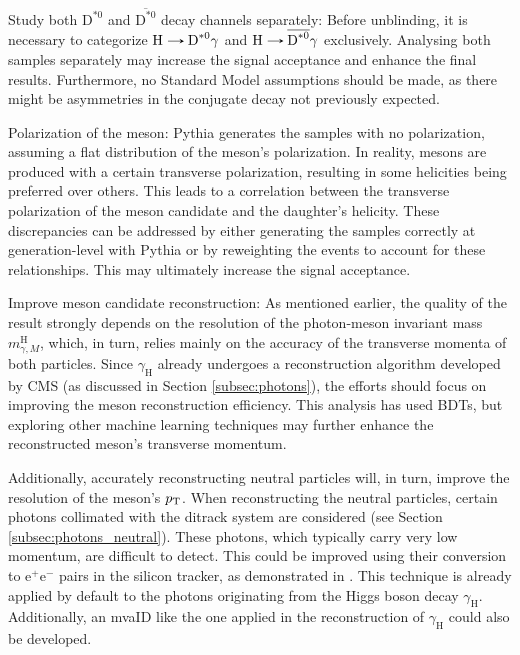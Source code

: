 \begin{myitemlist}
    \item[Study both $\text{D}^{*0}$ and $\overline{\text{D}^{*0}}$ decay channels separately:] Before unblinding, it is necessary to categorize $\text{H}\decaysto \text{D}^{*0}\gamma$ and $\text{H}\decaysto \overline{\text{D}^{*0}}\gamma$ exclusively. Analysing both samples separately may increase the signal acceptance and enhance the final results. Furthermore, no Standard Model assumptions should be made, as there might be asymmetries in the conjugate decay not previously expected.
    
    \item[Polarization of the meson:] Pythia generates the samples with no polarization, assuming a flat distribution of the meson's polarization. In reality, mesons are produced with a certain transverse polarization, resulting in some helicities being preferred over others. This leads to a correlation between the transverse polarization of the meson candidate and the daughter's helicity. These discrepancies can be addressed by either generating the samples correctly at generation-level with Pythia or by reweighting the events to account for these relationships. This may ultimately increase the signal acceptance.
    
    \item[Improve meson candidate reconstruction:] As mentioned earlier, the quality of the result \linebreak strong\-ly depends on the resolution of the photon-meson invariant mass $m^{\text{H}}_{\gamma, M}$, which, in turn, relies mainly on the accuracy of the transverse momenta of both particles. Since $\gamma_{\text{H}}$ already undergoes a reconstruction algorithm developed by CMS (as discussed in Section \ref{subsec:photons}), the efforts should focus on improving the meson reconstruction efficiency. This analysis has used BDTs, but exploring other machine learning techniques may further enhance the reconstructed meson's transverse momentum.
    
    Additionally, accurately reconstructing neutral particles will, in turn, improve the resolution of the meson's $p_\text{T}$. When reconstructing the neutral particles, certain photons collimated with the ditrack system are considered (see Section \ref{subsec:photons_neutral}). These photons, which typically carry very low momentum, are difficult to detect. This could be improved using their conversion to e$^+$e$^-$ pairs in the silicon tracker, as demonstrated in \cite{CMS:2018vgf}. This technique is already applied by default to the photons originating from the Higgs boson decay $\gamma_{\text{H}}$. Additionally, an mvaID like the one applied in the reconstruction of $\gamma_{\text{H}}$ could also be developed.
    

\end{myitemlist}
